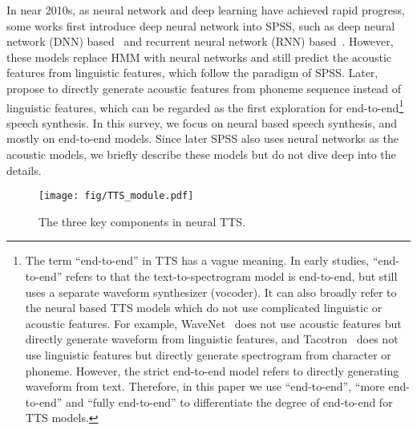 \documentclass{article}
\begin{document}
In near 2010s, as neural network and deep learning have achieved rapid progress, some works first introduce deep neural network into SPSS, such as deep neural network (DNN) based~\cite{zen2013statistical,qian2014training} and recurrent neural network (RNN) based~\cite{fan2014tts,zen2015acoustic,zen2015unidirectional}. However, these models replace HMM with neural networks and still predict the acoustic features from linguistic features, which follow the paradigm of SPSS. Later, \citet{wang2016first} propose to directly generate acoustic features from phoneme sequence instead of linguistic features, which can be regarded as the first exploration for end-to-end\footnote{The term ``end-to-end'' in TTS has a vague meaning. In early studies, ``end-to-end'' refers to that the text-to-spectrogram model is end-to-end, but still uses a separate waveform synthesizer (vocoder). It can also broadly refer to the neural based TTS models which do not use complicated linguistic or acoustic features. For example, WaveNet~\cite{oord2016wavenet} does not use acoustic features but directly generate waveform from linguistic features, and Tacotron~\cite{wang2017tacotron} does not use linguistic features but directly generate spectrogram from character or phoneme. However, the strict end-to-end model refers to directly generating waveform from text. Therefore, in this paper we use ``end-to-end'', ``more end-to-end'' and ``fully end-to-end'' to differentiate the degree of end-to-end for TTS models.} speech synthesis. In this survey, we focus on neural based speech synthesis, and mostly on end-to-end models. Since later SPSS also uses neural networks as the acoustic models, we briefly describe these models but do not dive deep into the details. 

\begin{figure}[h!]
  \centering
  \texttt{[image: fig/TTS\_module.pdf]}
  \caption{The three key components in neural TTS.}
  \label{fig_tts_module}
\end{figure}
\end{document}

